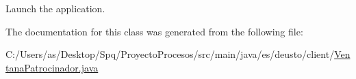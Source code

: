 Launch the application. 

The documentation for this class was generated from the following file\+:\begin{DoxyCompactItemize}
\item 
C\+:/\+Users/as/\+Desktop/\+Spq/\+Proyecto\+Procesos/src/main/java/es/deusto/client/\mbox{\hyperlink{_ventana_patrocinador_8java}{Ventana\+Patrocinador.\+java}}\end{DoxyCompactItemize}
